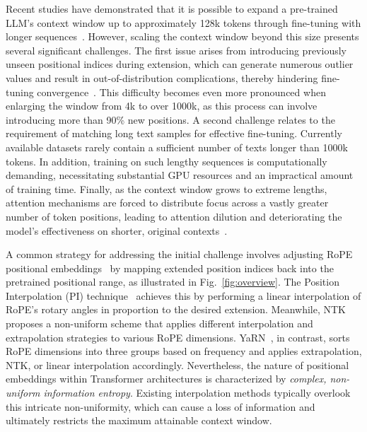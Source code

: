 Recent studies have demonstrated that it is possible to expand a pre-trained LLM's context window up to approximately 128k tokens through fine-tuning with longer sequences~\cite{longlora,pi,yarn,zhang2024soaring,liu2023scaling}. However, scaling the context window beyond this size presents several significant challenges. The first issue arises from introducing previously unseen positional indices during extension, which can generate numerous outlier values and result in out-of-distribution complications, thereby hindering fine-tuning convergence~\cite{pi}. This difficulty becomes even more pronounced when enlarging the window from 4k to over 1000k, as this process can involve introducing more than 90\% new positions. A second challenge relates to the requirement of matching long text samples for effective fine-tuning. Currently available datasets rarely contain a sufficient number of texts longer than 1000k tokens. In addition, training on such lengthy sequences is computationally demanding, necessitating substantial GPU resources and an impractical amount of training time. Finally, as the context window grows to extreme lengths, attention mechanisms are forced to distribute focus across a vastly greater number of token positions, leading to attention dilution and deteriorating the model’s effectiveness on shorter, original contexts~\cite{pi}.

A common strategy for addressing the initial challenge involves adjusting RoPE positional embeddings~\cite{rope,pi} by mapping extended position indices back into the pretrained positional range, as illustrated in Fig.~\ref{fig:overview}. The Position Interpolation (PI) technique~\cite{pi} achieves this by performing a linear interpolation of RoPE’s rotary angles in proportion to the desired extension. Meanwhile, NTK~\cite{ntk,dynamicntk} proposes a non-uniform scheme that applies different interpolation and extrapolation strategies to various RoPE dimensions. YaRN~\cite{yarn}, in contrast, sorts RoPE dimensions into three groups based on frequency and applies extrapolation, NTK, or linear interpolation accordingly. Nevertheless, the nature of positional embeddings within Transformer architectures is characterized by \emph{complex, non-uniform information entropy}. Existing interpolation methods typically overlook this intricate non-uniformity, which can cause a loss of information and ultimately restricts the maximum attainable context window.

